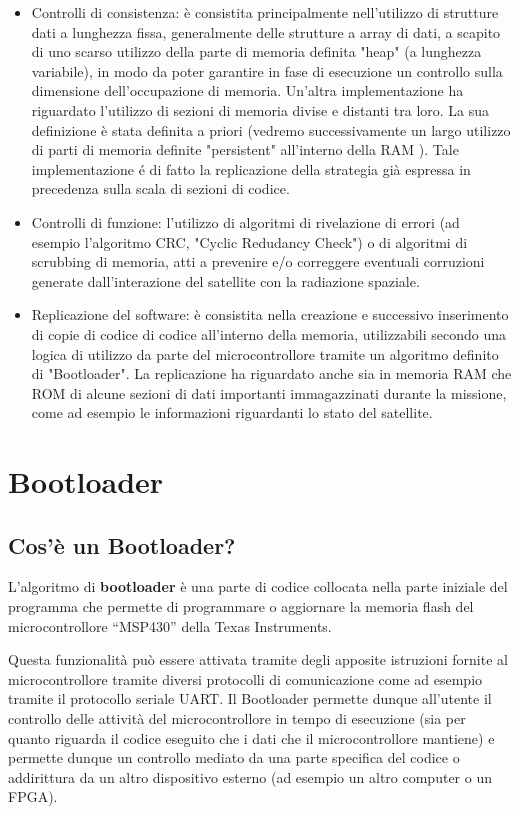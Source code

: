 \documentclass[LaM,binding=0.6cm,oneside]{../sapthesis}
\begin{document}
\begin{itemize}
    \item Controlli di consistenza: è consistita principalmente nell'utilizzo di strutture dati a lunghezza fissa, generalmente delle strutture a array di dati, a scapito di uno scarso utilizzo della parte di memoria definita "heap" (a lunghezza variabile), in modo da poter garantire in fase di esecuzione un controllo sulla dimensione dell'occupazione di memoria. 
    Un'altra implementazione ha riguardato l'utilizzo di sezioni di memoria divise e distanti tra loro. La sua definizione è stata definita a priori (vedremo successivamente un largo utilizzo di parti di memoria definite "persistent" all'interno della RAM ). Tale implementazione é di fatto la replicazione della strategia già espressa in precedenza sulla scala di sezioni di codice.
    
    \item Controlli di funzione: l'utilizzo di algoritmi di rivelazione di errori (ad esempio l'algoritmo CRC, "Cyclic Redudancy Check") o di algoritmi di scrubbing di memoria, atti a prevenire e/o correggere eventuali corruzioni generate dall'interazione del satellite con la radiazione spaziale.
    
    \item Replicazione del software: è consistita nella creazione e successivo inserimento di copie di codice di codice all'interno della memoria, utilizzabili secondo una logica di utilizzo da parte del microcontrollore tramite un algoritmo definito di "Bootloader". La replicazione ha riguardato anche sia in memoria RAM che ROM di alcune sezioni di dati importanti immagazzinati durante la missione, come ad esempio le informazioni riguardanti lo stato del satellite.
\end{itemize}

\chapter{Bootloader}

\section{Cos'è un Bootloader?}

L'algoritmo di \textbf{bootloader} è una parte di codice collocata nella parte iniziale del programma che permette di programmare o aggiornare la memoria flash del microcontrollore “MSP430” della Texas Instruments.

Questa funzionalità può essere attivata tramite degli apposite istruzioni fornite al microcontrollore tramite diversi protocolli di comunicazione come ad esempio tramite il protocollo seriale UART. 
Il Bootloader permette dunque all’utente il controllo delle attività del microcontrollore in tempo di esecuzione (sia per quanto riguarda il codice eseguito che i dati che il microcontrollore mantiene) e permette dunque un controllo mediato da una parte specifica del codice o addirittura da un altro dispositivo esterno (ad esempio un altro computer o un FPGA).
\end{document}
